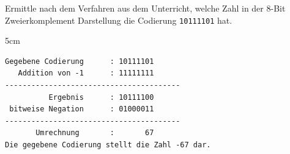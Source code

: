 \question[3]
Ermittle nach dem Verfahren aus dem Unterricht, welche Zahl in der 8-Bit Zweierkomplement
Darstellung die Codierung \texttt{10111101} hat.

\begin{solutionbox}{5cm}
\begin{lstlisting}
Gegebene Codierung      : 10111101
   Addition von -1      : 11111111
----------------------------------------
          Ergebnis      : 10111100
 bitweise Negation      : 01000011
----------------------------------------
       Umrechnung       :       67
Die gegebene Codierung stellt die Zahl -67 dar.
\end{lstlisting}
\end{solutionbox}
